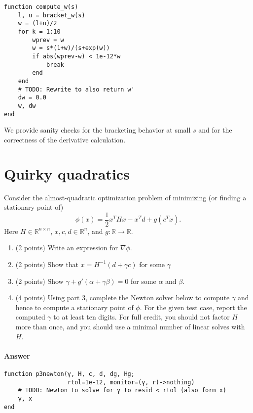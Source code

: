 \documentclass[12pt, leqno]{article} %
\providecommand{\tightlist}{%
  \setlength{\itemsep}{0pt}\setlength{\parskip}{0pt}}
\begin{document}
\begin{verbatim}
function compute_w(s)
    l, u = bracket_w(s)
    w = (l+u)/2
    for k = 1:10
        wprev = w
        w = s*(1+w)/(s+exp(w))
        if abs(wprev-w) < 1e-12*w
            break
        end
    end
    # TODO: Rewrite to also return w'
    dw = 0.0
    w, dw
end
\end{verbatim}

We provide sanity checks for the bracketing behavior at small \(s\) and
for the correctness of the derivative calculation.

\section{Quirky quadratics}

Consider the almost-quadratic optimization problem of minimizing (or
finding a stationary point of)
\[\phi(x) = \frac{1}{2} x^T H x - x^T d + g(c^T x).\] Here
\(H \in \mathbb{R}^{n \times n}\), \(x, c, d \in \mathbb{R}^n\), and
\(g : \mathbb{R} \rightarrow \mathbb{R}\).

\begin{enumerate}
\def\labelenumi{\arabic{enumi}.}
\tightlist
\item
  (2 points) Write an expression for \(\nabla \phi\).
\item
  (2 points) Show that \(x = H^{-1} (d + \gamma c)\) for some \(\gamma\)
\item
  (2 points) Show \(\gamma + g'(\alpha + \gamma \beta) = 0\) for some
  \(\alpha\) and \(\beta\).
\item
  (4 points) Using part 3, complete the Newton solver below to compute
  \(\gamma\) and hence to compute a stationary point of \(\phi\). For
  the given test case, report the computed \(\gamma\) to at least ten
  digits. For full credit, you should not factor \(H\) more than once,
  and you should use a minimal number of linear solves with \(H\).
\end{enumerate}

\paragraph{Answer}

\begin{verbatim}
function p3newton(γ, H, c, d, dg, Hg;
                  rtol=1e-12, monitor=(γ, r)->nothing)
    # TODO: Newton to solve for γ to resid < rtol (also form x)
    γ, x
end
\end{verbatim}
\end{document}
